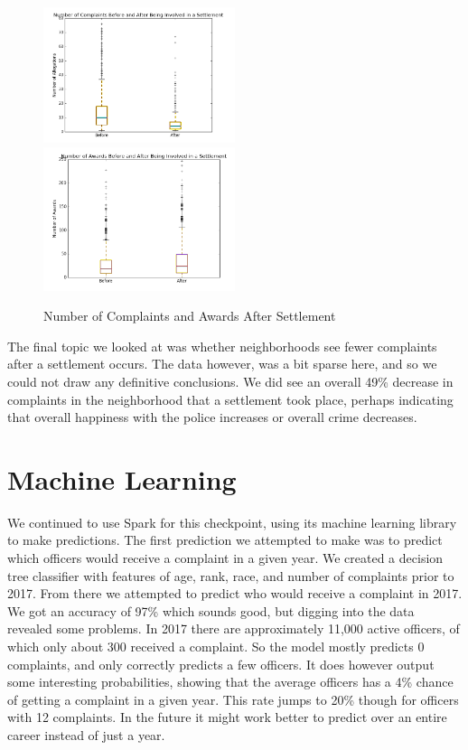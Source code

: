 \documentclass[11pt]{article}
\begin{document}
\begin{figure}[h!]
\caption{Number of Complaints and Awards After Settlement}
\includegraphics[width=0.5\textwidth]{settb.png}
\includegraphics[width=0.5\textwidth]{awards.png}
\end{figure}

The final topic we looked at was whether neighborhoods see fewer complaints after a settlement occurs. The data however, was a bit sparse here, and so we could not draw any definitive conclusions. We did see an overall 49\% decrease in complaints in the neighborhood that a settlement took place, perhaps indicating that overall happiness with the police increases or overall crime decreases.

\FloatBarrier
\section{Machine Learning}

We continued to use Spark for this checkpoint, using its machine learning library to make predictions. The first prediction we attempted to make was to predict which officers would receive a complaint in a given year. We created a decision tree classifier with features of age, rank, race, and number of complaints prior to 2017. From there we attempted to predict who would receive a complaint in 2017. We got an accuracy of 97\% which sounds good, but digging into the data revealed some problems. In 2017 there are approximately 11,000 active officers, of which only about 300 received a complaint. So the model mostly predicts 0 complaints, and only correctly predicts a few officers. It does however output some interesting probabilities, showing that the average officers has a 4\% chance of getting a complaint in a given year. This rate jumps to 20\% though for officers with 12 complaints. In the future it might work better to predict over an entire career instead of just a year.
\end{document}
